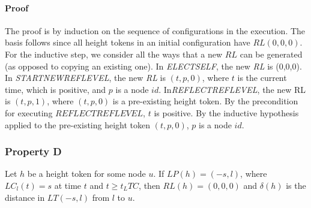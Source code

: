 \documentclass{article}
\begin{document}
\paragraph{Proof}
The proof is by induction on the sequence of configurations in the execution. The basis follows since all height tokens in an initial configuration have $RL(0, 0, 0)$.
For the inductive step, we consider all the ways that a new $RL$ can be generated (as opposed to copying an existing one). In \textit{ELECTSELF}, the new \textit{RL} is (0,0,0). In \textit{STARTNEWREFLEVEL}, the new \textit{RL} is $(t, p, 0)$, where $t$ is the current time, which is positive, and $p$ is a node $id$.
In\textit{REFLECTREFLEVEL}, the new RL is $(t, p, 1)$, where $(t, p, 0)$ is a pre-existing height token. By the precondition for executing $REFLECTREFLEVEL$, $t$ is positive. By the inductive hypothesis applied to the pre-existing height token $(t, p, 0)$, $p$ is a node $id$.

\subsubsection{Property D}
Let $h$ be a height token for some node $u$. If $LP(h) = (−s, l)$, where $LC_l(t) = s$ at time $t$ and $t \geq t_LTC$, then $RL(h) = (0, 0, 0)$ and $\delta (h)$ is the distance in $LT(−s, l)$ from $l$ to $u$.
\end{document}
